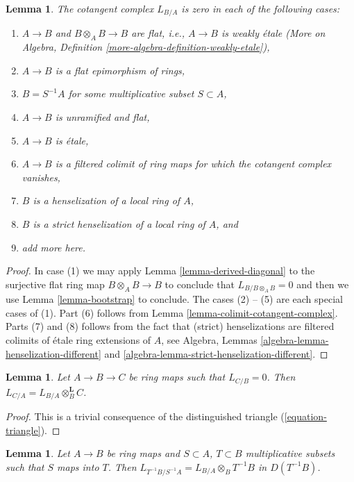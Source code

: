 \documentclass{stacks-project}
\theoremstyle{plain}
\newtheorem{lemma}[subsection]{Lemma}
\theoremstyle{definition}
\theoremstyle{remark}
\numberwithin{equation}{subsection}
\begin{document}
\begin{lemma}
\label{lemma-when-zero}
The cotangent complex $L_{B/A}$ is zero in each of the following cases:
\begin{enumerate}
\item $A \to B$ and $B \otimes_A B \to B$ are flat, i.e., $A \to B$
is weakly \'etale
(More on Algebra, Definition \ref{more-algebra-definition-weakly-etale}),
\item $A \to B$ is a flat epimorphism of rings,
\item $B = S^{-1}A$ for some multiplicative subset $S \subset A$,
\item $A \to B$ is unramified and flat,
\item $A \to B$ is \'etale,
\item $A \to B$ is a filtered colimit of ring maps for which
the cotangent complex vanishes,
\item $B$ is a henselization of a local ring of $A$,
\item $B$ is a strict henselization of a local ring of $A$, and
\item add more here.
\end{enumerate}
\end{lemma}

\begin{proof}
In case (1) we may apply
Lemma \ref{lemma-derived-diagonal}
to the surjective flat ring map $B \otimes_A B \to B$
to conclude that $L_{B/B \otimes_A B} = 0$ and then we use
Lemma \ref{lemma-bootstrap}
to conclude. The cases (2) -- (5) are each special cases of (1).
Part (6) follows from Lemma \ref{lemma-colimit-cotangent-complex}.
Parts (7) and (8) follows from the fact that (strict) henselizations
are filtered colimits of \'etale ring extensions of $A$, see
Algebra, Lemmas \ref{algebra-lemma-henselization-different} and
\ref{algebra-lemma-strict-henselization-different}.
\end{proof}

\begin{lemma}
\label{lemma-localize-on-top}
Let $A \to B \to C$ be ring maps such that $L_{C/B} = 0$.
Then $L_{C/A} = L_{B/A} \otimes_B^\mathbf{L} C$.
\end{lemma}

\begin{proof}
This is a trivial consequence of 
the distinguished triangle (\ref{equation-triangle}).
\end{proof}

\begin{lemma}
\label{lemma-localize}
Let $A \to B$ be ring maps and $S \subset A$, $T \subset B$ multiplicative
subsets such that $S$ maps into $T$.
Then $L_{T^{-1}B/S^{-1}A} = L_{B/A} \otimes_B T^{-1}B$
in $D(T^{-1}B)$.
\end{lemma}
\end{document}
